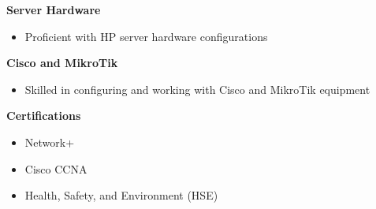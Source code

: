\begin{paracol}{2}
	\begin{onecolentry}
		\textbf{Server Hardware}
		\begin{itemize}[leftmargin=0.5cm, itemsep=0.1cm]
			\item Proficient with HP server hardware configurations
		\end{itemize}
	\end{onecolentry}
	
	\switchcolumn
	\begin{onecolentry}
		\textbf{Cisco and MikroTik}
		\begin{itemize}[leftmargin=0.5cm, itemsep=0.1cm]
			\item Skilled in configuring and working with Cisco and MikroTik equipment
		\end{itemize}
	\end{onecolentry}
\end{paracol}

\vspace{0.3 cm} %

\begin{paracol}{2}
	\begin{onecolentry}
		\textbf{Certifications}
		\begin{itemize}[leftmargin=0.5cm, itemsep=0.1cm]
			\item Network+
			\item Cisco CCNA
			\item Health, Safety, and Environment (HSE)
		\end{itemize}
	\end{onecolentry}
\end{paracol}

\vspace{0.3 cm} %

